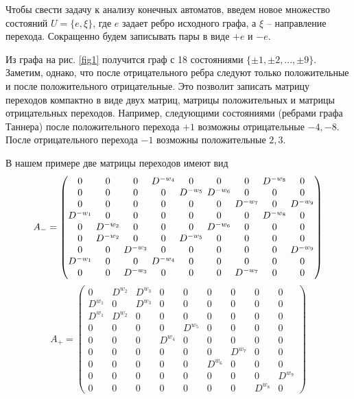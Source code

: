 Чтобы свести задачу к анализу конечных автоматов, введем новое множество состояний 
$U=\{e,\xi\}$, где  $e$ задает ребро исходного графа, а $\xi$ -- направление перехода. 
Сокращенно будем записывать пары в виде $+e$  и $-e$.   
 
Из графа на рис. \ref{fig1} получится  граф с 18 состояниями $\{ \pm 1, \pm 2,..., \pm 9\}$.
Заметим, однако, что после отрицательного  ребра следуют только положительные и после 
положительного отрицательные. Это позволит записать матрицу переходов компактно 
в виде двух матриц, матрицы положительных и матрицы отрицательных переходов.
Например, следующими состояниями (ребрами графа Таннера) после положительного перехода 
$+1$  возможны отрицательные $-4, -8$. После отрицательного перехода
$-1$  возможны положительные $2, 3$. 

В нашем примере две матрицы переходов  имеют вид
 \[
 \setlength{\arraycolsep}{2.pt}
A_{-}=
\begin{pmatrix}
  0           &0          & 0     &D^{-w_4}& 0              & 0&0 & D^{-w_8}&0 \\
   0          & 0        & 0     & 0    &D^{-w_5}&D^{-w_6}&   0 &    0 &  0  \\ 
    0         &  0       &  0    & 0    &   0  &   0  &D^{-w_7}&   0  &D^{-w_9}\\ 
D^{-w_1}&  0       &    0  &   0  &   0  &   0  & 0   &D^{-w_8}&  0  \\ 
  0          &D^{-w_2}&  0    & 0    &  0   &D^{-w_6}&  0  & 0    &0    \\ 
   0         &D^{-w_2}&   0   &  0   & D^{-w_5}&   0  &  0  &  0   & 0   \\ 
   0         &0         &D^{-w_3}& 0    &  0   &   0  &0    &0     &D^{-w_9} \\ 
D^{-w_1}&0         &   0   &D^{-w_4}&  0   & 0    & 0   &   0  &0    \\ 
   0        & 0        &D^{-w_3} &   0  &    0 &  0   &D^{-w_7}    & 0    &0     
               \end{pmatrix}
\]
\[
A_{+}=
\begin{pmatrix}
0              &D^{w_2}&D^{w_3}&  0  &      0         & 0&0 &0 &0 \\
D^{w_1}& 0              &D^{w_3}&0    &      0         &0 &0 &0 &0 \\
D^{w_1}&D^{w_2}&0               & 0   &       0        &0 &0 &0 &0 \\
0              & 0             &0                &0    &D^{w_5}&0 &0 & 0& 0 \\
 0             &  0            &0                & D^{w_4}& 0 &0 &0  &0 & 0 \\
  0            &   0           & 0               &  0& 0 & 0&D^{w_7}  &0 &0  \\
   0           &    0          &  0              & 0 & 0 &D^{w_6}&0  &0 &0  \\
    0          &      0        &   0             & 0 & 0 & 0& 0& 0&  D^{w_9} \\
     0         &     0         &    0            & 0 & 0&0 & 0&  D^{w_8} &0
\end{pmatrix}
\]

